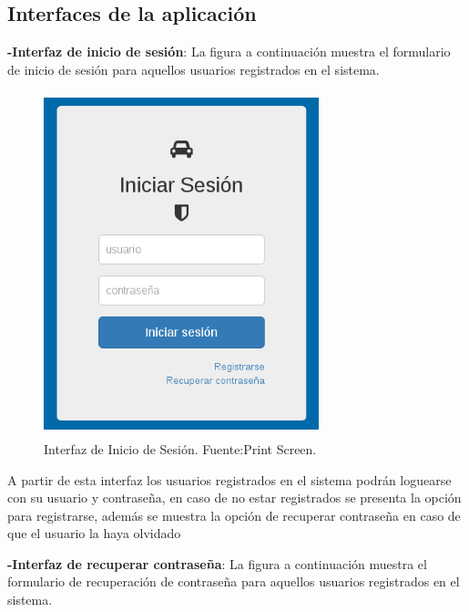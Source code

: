\subsection{Interfaces de la aplicación}
\setlength{\parskip}{5mm}

\textbf{-Interfaz de inicio de sesión}: La figura a continuación muestra el formulario de inicio de sesión para aquellos usuarios registrados en el sistema.

\begin{figure}[H]
\begin{center}
	\includegraphics[width=8cm,height=10cm]{img/interfaces/inicio_sesion.png}
\end{center}
\caption{Interfaz de Inicio de Sesión. Fuente:Print Screen.}
\label{fig:interfaz_inicion_sesion}
\end{figure}

A partir de esta interfaz los usuarios registrados en el sistema podrán loguearse con su usuario y contraseña, en caso de no estar registrados se presenta la opción para registrarse, además se muestra la opción de recuperar contraseña en caso de que el usuario la haya olvidado

\textbf{-Interfaz de recuperar contraseña}: La figura a continuación muestra el formulario de recuperación de contraseña para aquellos usuarios registrados en el sistema.


